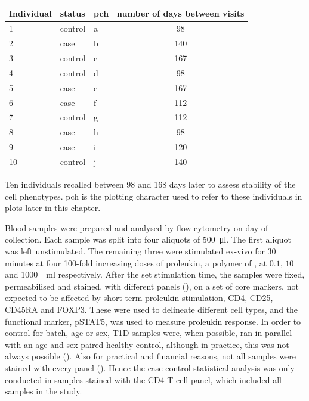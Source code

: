 \begin{table}[ht]
\centering
\begin{tabular}{lllc}
  \hline
Individual & status  & pch & number of days between visits \\
  \hline
1          & control & a   & 98 \\
2          & case    & b   & 140 \\
3          & control & c   & 167 \\
4          & control & d   & 98 \\
5          & case    & e   & 167 \\
6          & case    & f   & 112 \\
7          & control & g   & 112 \\
8          & case    & h   & 98 \\
9          & case    & i   & 120 \\
10         & control & j   & 140 \\
   \hline
\end{tabular}
{Ten individuals recalled between 98 and 168 days later to assess stability of the cell phenotypes. }
{
pch is the plotting character used to refer to these individuals in plots later in this chapter.
}
\end{table}
Blood samples were prepared and analysed by flow cytometry on day of collection.
Each sample was split into four aliquots of \SI{500}{\micro\litre}.
The first aliquot was left unstimulated.
The remaining three were stimulated ex-vivo for 30 minutes at four 100-fold increasing doses
of proleukin, a polymer of , at $0.1$, $10$ and \SI{1000}{\unit\per\milli\litre} respectively.
After the set stimulation time, the samples were fixed, permeabilised and stained, with different panels (), 
on a set of core markers, not expected to be affected by short-term proleukin stimulation,
CD4, CD25, CD45RA and FOXP3.
These were used to delineate different cell types, and the functional marker, pSTAT5,
was used to measure proleukin response.
In order to control for batch, age or sex, \gls{T1D} samples were, when possible, ran in parallel with an age and sex paired healthy control, although in practice, this was not always possible ().
Also for practical and financial reasons, not all samples were stained with every panel ().
Hence the case-control statistical analysis was only conducted in samples stained with the CD4 T cell panel, which included all samples in the study.

